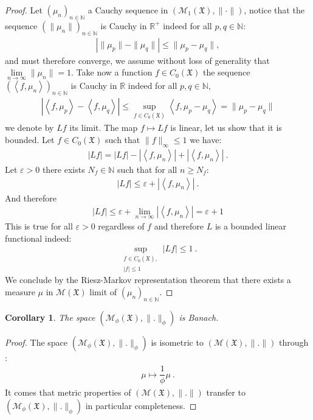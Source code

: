 \documentclass[11pt,a4paper]{article}
\newcommand{\RR}{\mathbb{R}}
\newcommand{\NN}{\mathbb{N}}
\newcommand{\MC}{\mathcal{M}}
\newcommand{\XF}{\mathfrak{X}}
\newcommand{\Seq}[1]{\left(#1\right)_{n\in \mathbb{N}}}
\newcommand{\brac}[1]{\left\langle#1\right\rangle}
\newtheorem{corollary}[theorem]{Corollary}
\begin{document}
\begin{proof}
    Let $\Seq{\mu_n}$ a Cauchy sequence in \(\left(\MC_1\left(\XF\right),\| \cdot\|\right) \), notice that the sequence $\Seq{\|\mu_n\|}$ is Cauchy in $\RR^+$ indeed for all $p,q \in \NN$:
    \begin{align*}
        \left| \|\mu_p\| - \|\mu_q\| \right| \leq \|\mu_p - \mu_q\|,
    \end{align*}
    and must therefore converge, we assume without loss of generality that $\lim\limits_{n\to\infty} \|\mu_n\| = 1$. Take now a function $f \in C_0(\XF)$ the sequence $\Seq{\brac{f,\mu_n}}$ is Cauchy in $\RR$ indeed for all $p,q \in \NN$,
    \begin{align*}
         \left| \brac{f,\mu_p} -  \brac{f,\mu_q}\right| \leq \sup\limits_{f \in C_0(\XF)} \brac{f,\mu_p - \mu_q} = \| \mu_p - \mu_q\| 
    \end{align*}
    we denote by $Lf$ its limit. The map $f \mapsto Lf$ is linear, let us show that it is bounded. Let $f \in C_0(\XF)$ such that $\|f\|_{\infty} \leq 1$ we have:
    \begin{align*}
        \left|Lf\right| = \left|Lf\right| - \left|\brac{f,\mu_n} \right| + \left|\brac{f,\mu_n} \right|\ .
    \end{align*}
    Let $\varepsilon > 0$ there exists $N_f \in \NN$ such that for all $n \geq N_f$:
     \begin{align*}
        \left|Lf\right| \leq \varepsilon + \left|\brac{f,\mu_n} \right|\ .
    \end{align*}
    And therefore
    \begin{align*}
        \left|Lf\right| \leq \varepsilon + \lim\limits_{n\to \infty}\left|\brac{f,\mu_n} \right| = \varepsilon + 1
    \end{align*}
    This is true for all $\varepsilon > 0$ regardless of $f$ and therefore $L$ is a bounded linear functional indeed:
    \[ \sup\limits_{\substack{f\in C_0(\XF) ,\\ |f| \leq 1}} |Lf| \leq 1\ . \]
    We conclude by the Riesz-Markov representation theorem that there exists a measure $\mu $ in $\MC(\XF)$ limit of $\Seq{\mu_n}$.
\end{proof}
\begin{corollary}\label{cor:Banach-wheigted-space}
    The space \(\left(\MC_{\phi}\left(\XF\right),\| .\|_{\phi}\right) \) is Banach.
\end{corollary}
\begin{proof}
    The space \(\left(\MC_{\phi}\left(\XF\right),\| .\|_{\phi}\right) \) is isometric to \(\left(\MC\left(\XF\right),\| .\|\right) \) through :
    \begin{align*}
        \mu \mapsto \dfrac{1}{\phi} \mu\ .
    \end{align*}
    It comes that metric properties of \(\left(\MC\left(\XF\right),\| .\|\right) \) transfer to \(\left(\MC_{\phi}\left(\XF\right),\| .\|_{\phi}\right) \) in particular completeness.
\end{proof}
\end{document}
